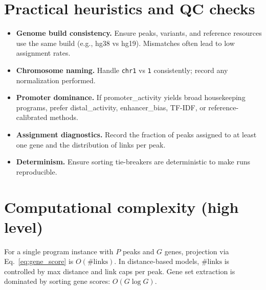 \documentclass[11pt]{article}
\begin{document}
\section{Practical heuristics and QC checks}
\begin{itemize}[leftmargin=2em]
\item \textbf{Genome build consistency.} Ensure peaks, variants, and reference resources use the same build (e.g., hg38 vs hg19). Mismatches often lead to low assignment rates.
\item \textbf{Chromosome naming.} Handle \texttt{chr1} vs \texttt{1} consistently; record any normalization performed.
\item \textbf{Promoter dominance.} If promoter\_activity yields broad housekeeping programs, prefer distal\_activity, enhancer\_bias, TF-IDF, or reference-calibrated methods.
\item \textbf{Assignment diagnostics.} Record the fraction of peaks assigned to at least one gene and the distribution of links per peak.
\item \textbf{Determinism.} Ensure sorting tie-breakers are deterministic to make runs reproducible.
\end{itemize}

\section{Computational complexity (high level)}
For a single program instance with $P$ peaks and $G$ genes, projection via Eq.\ \ref{eq:gene_score} is $O(\#\text{links})$. In distance-based models, $\#\text{links}$ is controlled by max distance and link caps per peak. Gene set extraction is dominated by sorting gene scores: $O(G \log G)$.
\end{document}
